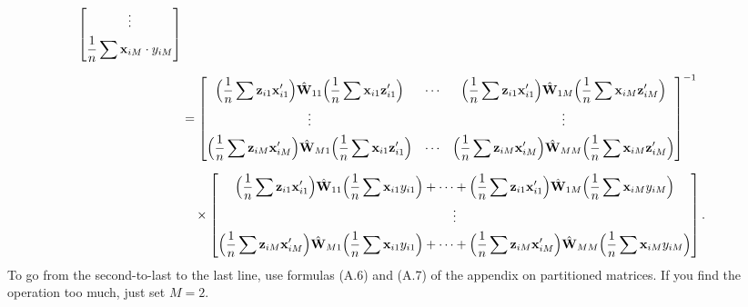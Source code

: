 \begin{align}
\begin{bmatrix}
\vdots \\[4pt]
\dfrac{1}{n} \displaystyle\sum \mathbf{x}_{iM} \cdot y_{iM}
\end{bmatrix} \notag \\[6pt]
&= \begin{bmatrix}
\Bigl(\dfrac{1}{n} \displaystyle\sum \mathbf{z}_{i1} \mathbf{x}_{i1}'\Bigr)
\hat{\mathbf{W}}_{11}
\Bigl(\dfrac{1}{n} \displaystyle\sum \mathbf{x}_{i1} \mathbf{z}_{i1}'\Bigr)
& \cdots &
\Bigl(\dfrac{1}{n} \displaystyle\sum \mathbf{z}_{i1} \mathbf{x}_{i1}'\Bigr)
\hat{\mathbf{W}}_{1M}
\Bigl(\dfrac{1}{n} \displaystyle\sum \mathbf{x}_{iM} \mathbf{z}_{iM}'\Bigr) \\[6pt]
\vdots & & \vdots \\[4pt]
\Bigl(\dfrac{1}{n} \displaystyle\sum \mathbf{z}_{iM} \mathbf{x}_{iM}'\Bigr)
\hat{\mathbf{W}}_{M1}
\Bigl(\dfrac{1}{n} \displaystyle\sum \mathbf{x}_{i1} \mathbf{z}_{i1}'\Bigr)
& \cdots &
\Bigl(\dfrac{1}{n} \displaystyle\sum \mathbf{z}_{iM} \mathbf{x}_{iM}'\Bigr)
\hat{\mathbf{W}}_{MM}
\Bigl(\dfrac{1}{n} \displaystyle\sum \mathbf{x}_{iM} \mathbf{z}_{iM}'\Bigr)
\end{bmatrix}^{-1} \notag \\[6pt]
&\quad \times
\begin{bmatrix}
\Bigl(\dfrac{1}{n} \displaystyle\sum \mathbf{z}_{i1} \mathbf{x}_{i1}'\Bigr)
\hat{\mathbf{W}}_{11}
\Bigl(\dfrac{1}{n} \displaystyle\sum \mathbf{x}_{i1} y_{i1}\Bigr)
+ \cdots +
\Bigl(\dfrac{1}{n} \displaystyle\sum \mathbf{z}_{i1} \mathbf{x}_{i1}'\Bigr)
\hat{\mathbf{W}}_{1M}
\Bigl(\dfrac{1}{n} \displaystyle\sum \mathbf{x}_{iM} y_{iM}\Bigr) \\[6pt]
\vdots \\[4pt]
\Bigl(\dfrac{1}{n} \displaystyle\sum \mathbf{z}_{iM} \mathbf{x}_{iM}'\Bigr)
\hat{\mathbf{W}}_{M1}
\Bigl(\dfrac{1}{n} \displaystyle\sum \mathbf{x}_{i1} y_{i1}\Bigr)
+ \cdots +
\Bigl(\dfrac{1}{n} \displaystyle\sum \mathbf{z}_{iM} \mathbf{x}_{iM}'\Bigr)
\hat{\mathbf{W}}_{MM}
\Bigl(\dfrac{1}{n} \displaystyle\sum \mathbf{x}_{iM} y_{iM}\Bigr)
\end{bmatrix}.
\label{eq:4.2.6}
\end{align}
To go from the second-to-last to the last line, use formulas (A.6) and (A.7) of
the appendix on partitioned matrices. If you find the operation too much, just set
$M = 2$.
